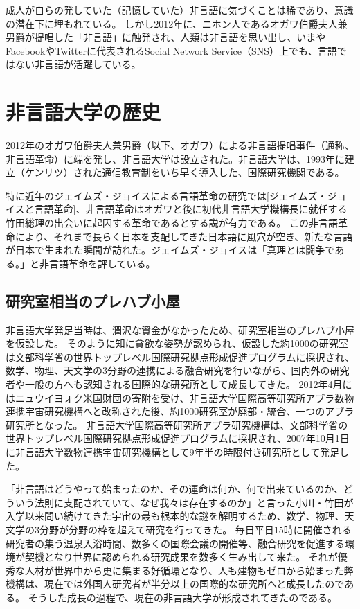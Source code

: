 成人が自らの発していた（記憶していた）非言語に気づくことは稀であり、意識の潜在下に埋もれている。
しかし2012年に、ニホン人であるオガワ伯爵夫人兼男爵が提唱した「非言語」に触発され、人類は非言語を思い出し、いまやFacebookやTwitterに代表されるSocial Network Service（SNS）上でも、言語ではない非言語が活躍している。

\section{非言語大学の歴史}
2012年のオガワ伯爵夫人兼男爵（以下、オガワ）による非言語提唱事件（通称、非言語革命）に端を発し、非言語大学は設立された。非言語大学は、1993年に建立（ケンリツ）された通信教育制をいち早く導入した、国際研究機関である。
\par
特に近年のジェイムズ・ジョイスによる言語革命の研究では[ジェイムズ・ジョイスと言語革命]、非言語革命はオガワと後に初代非言語大学機構長に就任する竹田総理の出会いに起因する革命であるとする説が有力である。
この非言語革命により、それまで長らく日本を支配してきた日本語に風穴が空き、新たな言語が日本で生まれた瞬間が訪れた。ジェイムズ・ジョイスは「真理とは闘争である。」と非言語革命を評している。

\subsection{研究室相当のプレハブ小屋}
非言語大学発足当時は、潤沢な資金がなかったため、研究室相当のプレハブ小屋を仮設した。
そのように知に貪欲な姿勢が認められ、仮設した約1000の研究室は文部科学省の世界トップレベル国際研究拠点形成促進プログラムに採択され、数学、物理、天文学の3分野の連携による融合研究を行いながら、国内外の研究者や一般の方へも認知される国際的な研究所として成長してきた。
2012年4月にはニュウイヨォク米国財団の寄附を受け、非言語大学国際高等研究所アブラ数物連携宇宙研究機構へと改称された後、約1000研究室が廃部・統合、一つのアブラ研究所となった。
非言語大学国際高等研究所アブラ研究機構は、文部科学省の世界トップレベル国際研究拠点形成促進プログラムに採択され、2007年10月1日に非言語大学数物連携宇宙研究機構として9年半の時限付き研究所として発足した。

「非言語はどうやって始まったのか、その運命は何か、何で出来ているのか、どういう法則に支配されていて、なぜ我々は存在するのか」と言った小川・竹田が入学以来問い続けてきた宇宙の最も根本的な謎を解明するため、数学、物理、天文学の3分野が分野の枠を超えて研究を行ってきた。
毎日平日15時に開催される研究者の集う温泉入浴時間、数多くの国際会議の開催等、融合研究を促進する環境が契機となり世界に認められる研究成果を数多く生み出して来た。
それが優秀な人材が世界中から更に集まる好循環となり、人も建物もゼロから始まった弊機構は、現在では外国人研究者が半分以上の国際的な研究所へと成長したのである。
そうした成長の過程で、現在の非言語大学が形成されてきたのである。

